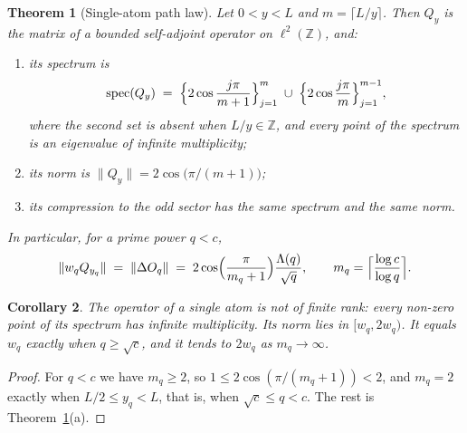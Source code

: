 \documentclass[11pt,a4paper]{article}
\theoremstyle{plain}
\newtheorem{theorem}{Theorem}[section]
\newtheorem{corollary}[theorem]{Corollary}
\theoremstyle{definition}
\theoremstyle{remark}
\newcommand{\Z}{\mathbb{Z}}
\newcommand{\spec}{\operatorname{spec}}
\begin{document}
\begin{theorem}[Single-atom path law]\label{thm:pathlaw}
Let $0 < y < L$ and $m = \lceil L/y\rceil$. Then $Q_y$ is the matrix of a bounded self-adjoint operator on $\ell^2(\Z)$, and:
\begin{enumerate}[label=(\alph*), leftmargin=1.8em]
  \item its spectrum is
  \begin{equation}\label{eq:spec}
    \spec(Q_y) \;=\; \Bigl\{ 2\cos\frac{j\pi}{m+1} \Bigr\}_{j=1}^{m} \;\cup\; \Bigl\{ 2\cos\frac{j\pi}{m} \Bigr\}_{j=1}^{m-1},
  \end{equation}
  where the second set is absent when $L/y \in \Z$, and every point of the spectrum is an eigenvalue of infinite multiplicity;
  \item its norm is $\|Q_y\| = 2\cos\bigl(\pi/(m+1)\bigr)$;
  \item its compression to the odd sector has the same spectrum and the same norm.
\end{enumerate}
In particular, for a prime power $q < c$,
\begin{equation}\label{eq:path_norm}
  \|w_q Q_{y_q}\| \;=\; \|\Delta O_q\| \;=\; 2\cos\Bigl(\frac{\pi}{m_q + 1}\Bigr)\frac{\Lambda(q)}{\sqrt q}, \qquad m_q = \Bigl\lceil \frac{\log c}{\log q} \Bigr\rceil .
\end{equation}
\end{theorem}

\begin{corollary}\label{cor:range}
The operator of a single atom is not of finite rank: every non-zero point of its spectrum has infinite multiplicity. Its norm lies in $[w_q, 2w_q)$. It equals $w_q$ exactly when $q \ge \sqrt c$, and it tends to $2w_q$ as $m_q \to \infty$.
\end{corollary}

\begin{proof}
For $q < c$ we have $m_q \ge 2$, so $1 \le 2\cos(\pi/(m_q+1)) < 2$, and $m_q = 2$ exactly when $L/2 \le y_q < L$, that is, when $\sqrt c \le q < c$. The rest is Theorem~\ref{thm:pathlaw}(a).
\end{proof}
\end{document}
